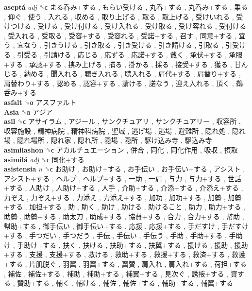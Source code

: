 \textbf{aseptá} \emph{adj}  ␝ϲ   まる呑み+する ,  もらい受ける ,  丸呑+する ,  丸呑み+する ,  乗る ,  仰ぐ ,  使う ,  入れる ,  収める ,  取り上げる ,  取る ,  取上げる ,  受けいれる ,  受けつける ,  受ける ,  受け付ける ,  受け入れる ,  受け取る ,  受け容れる ,  受付ける ,  受入れる ,  受取る ,  受容+する ,  受容れる ,  受諾+する ,  召す ,  同意+する ,  宜う ,  宜なう ,  引きうける ,  引き取る ,  引き受ける ,  引き請ける ,  引取る ,  引受ける ,  引受る ,  引請ける ,  応じる ,  応ずる ,  応諾+する ,  戴く ,  承伏+する ,  承服+する ,  承認+する ,  挟み上げる ,  捕る ,  掛かる ,  採る ,  接受+する ,  獲る ,  甘んじる ,  納める ,  聞入れる ,  聴き入れる ,  聴入れる ,  肩代+する ,  肩替り+する ,  肩替わり+する ,  認める ,  認容+する ,  請ける ,  諾なう ,  迎え入れる ,  頂く ,  鵜呑み+する   \\
\textbf{asfalt} ␝α   アスファルト   \\
\textbf{Asia} ␝α   アジア   \\
\textbf{asil} ␝ϲ   アサイラム ,  アジール ,  サンクチュアリ ,  サンクチュアリー ,  収容所 ,  収容施設 ,  精神病院 ,  精神科病院 ,  聖域 ,  逃げ場 ,  逃場 ,  避難所 ,  隠れ処 ,  隠れ場 ,  隠れ場所 ,  隠れ家 ,  隠れ所 ,  隠場 ,  隠所 ,  駆け込み寺 ,  駆込み寺   \\
\textbf{asimilashon} ␝ϲ   アカルチュエーション ,  併合 ,  同化 ,  同化作用 ,  吸収 ,  摂取   \\
\textbf{asimilá} \emph{adj}  ␝ϲ   同化+する   \\
\textbf{asistensia} \emph{n}  ␝ϲ   お助け ,  お助け+する ,  お手伝い ,  お手伝い+する ,  アシスト ,  アシスト+する ,  ヘルプ ,  ヘルプ+する ,  一助 ,  一肩 ,  与力 ,  与力+する ,  世話+する ,  人助け ,  人助け+する ,  人手 ,  介助+する ,  介添+する ,  介添え+する ,  力ぞえ ,  力ぞえ+する ,  力添え ,  力添え+する ,  加功 ,  加功+する ,  加勢 ,  加勢+する ,  加担+する ,  助 ,  助く ,  助け ,  助ける ,  助けること ,  助力 ,  助力+する ,  助勢 ,  助勢+する ,  助太刀 ,  助成+する ,  協賛+する ,  合力 ,  合力+する ,  幇助 ,  幇助+する ,  御手伝い ,  御手伝い+する ,  応援 ,  応援+する ,  手だすけ ,  手だすけ+する ,  手つだい ,  手つだう ,  手伝 ,  手伝い ,  手伝う ,  手助 ,  手助+する ,  手助け ,  手助け+する ,  扶く ,  扶ける ,  扶助+する ,  扶翼+する ,  援ける ,  援助 ,  援助+する ,  支援 ,  支援+する ,  救ける ,  救助+する ,  救援+する ,  救済+する ,  救護+する ,  片肌脱ぐ ,  羽翼 ,  羽翼+する ,  翼賛 ,  肩入れ ,  肩入れ+する ,  荷担+する ,  補佐 ,  補佐+する ,  補助 ,  補助+する ,  補翼+する ,  見次ぐ ,  誘掖+する ,  資する ,  賛助+する ,  輔く ,  輔ける ,  輔佐 ,  輔佐+する ,  輔助+する ,  輔翼+する   \\
